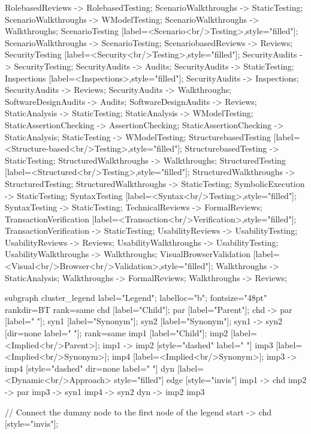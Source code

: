 \documentclass{article}
\begin{document}
{RolebasedReviews -> RolebasedTesting;
ScenarioWalkthroughs -> StaticTesting;
ScenarioWalkthroughs -> WModelTesting;
ScenarioWalkthroughs -> Walkthroughs;
ScenarioTesting [label=<Scenario<br/>Testing>,style="filled"];
ScenarioWalkthroughs -> ScenarioTesting;
ScenariobasedReviews -> Reviews;
SecurityTesting [label=<Security<br/>Testing>,style="filled"];
SecurityAudits -> SecurityTesting;
SecurityAudits -> Audits;
SecurityAudits -> StaticTesting;
Inspections [label=<Inspections>,style="filled"];
SecurityAudits -> Inspections;
SecurityAudits -> Reviews;
SecurityAudits -> Walkthroughs;
SoftwareDesignAudits -> Audits;
SoftwareDesignAudits -> Reviews;
StaticAnalysis -> StaticTesting;
StaticAnalysis -> WModelTesting;
StaticAssertionChecking -> AssertionChecking;
StaticAssertionChecking -> StaticAnalysis;
StaticTesting -> WModelTesting;
StructurebasedTesting [label=<Structure-based<br/>Testing>,style="filled"];
StructurebasedTesting -> StaticTesting;
StructuredWalkthroughs -> Walkthroughs;
StructuredTesting [label=<Structured<br/>Testing>,style="filled"];
StructuredWalkthroughs -> StructuredTesting;
StructuredWalkthroughs -> StaticTesting;
SymbolicExecution -> StaticTesting;
SyntaxTesting [label=<Syntax<br/>Testing>,style="filled"];
SyntaxTesting -> StaticTesting;
TechnicalReviews -> FormalReviews;
TransactionVerification [label=<Transaction<br/>Verification>,style="filled"];
TransactionVerification -> StaticTesting;
UsabilityReviews -> UsabilityTesting;
UsabilityReviews -> Reviews;
UsabilityWalkthroughs -> UsabilityTesting;
UsabilityWalkthroughs -> Walkthroughs;
VisualBrowserValidation [label=<Visual<br/>Browser<br/>Validation>,style="filled"];
Walkthroughs -> StaticAnalysis;
Walkthroughs -> FormalReviews;
Walkthroughs -> Reviews;

subgraph cluster_legend {
    label="Legend";
    labelloc="b";
    fontsize="48pt"
    rankdir=BT
    {
        rank=same
        chd [label="Child"];
        par [label="Parent"];
        chd -> par [label="                "];
        syn1 [label="Synonym"];
        syn2 [label="Synonym"];
        syn1 -> syn2 [dir=none label="                "];
    }
    {
        rank=same
        imp1 [label="Child"];
        imp2 [label=<Implied<br/>Parent>];
        imp1 -> imp2 [style="dashed" label="                "]
        imp3 [label=<Implied<br/>Synonym>];
        imp4 [label=<Implied<br/>Synonym>];
        imp3 -> imp4 [style="dashed" dir=none label="                "]
    }
        dyn [label=<Dynamic<br/>Approach> style="filled"]
    edge [style="invis"]
    imp1 -> chd
    imp2 -> par
    imp3 -> syn1
    imp4 -> syn2
dyn -> { imp2 imp3 }
}

// Connect the dummy node to the first node of the legend
start -> chd [style="invis"];
}
\end{document}

